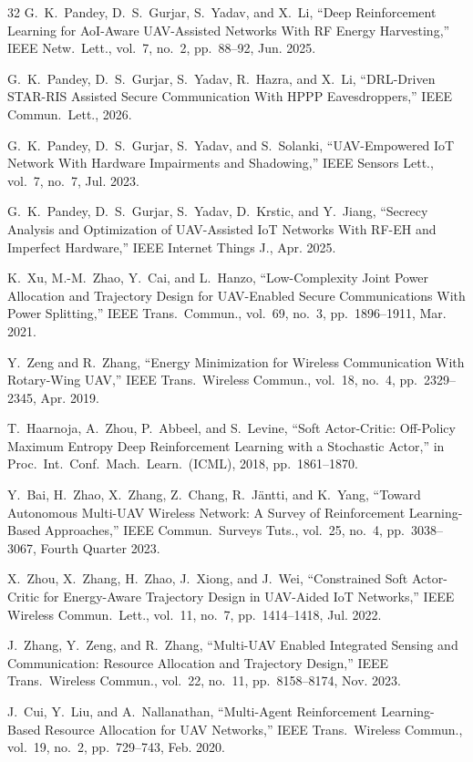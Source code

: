 \documentclass[journal]{IEEEtran}
\begin{document}
\begin{thebibliography}{32}
G.~K.~Pandey, D.~S.~Gurjar, S.~Yadav, and X.~Li,
``Deep Reinforcement Learning for AoI-Aware UAV-Assisted Networks With RF Energy Harvesting,''
IEEE Netw.\ Lett., vol.~7, no.~2, pp.~88--92, Jun. 2025.

G.~K.~Pandey, D.~S.~Gurjar, S.~Yadav, R.~Hazra, and X.~Li,
``DRL-Driven STAR-RIS Assisted Secure Communication With HPPP Eavesdroppers,''
IEEE Commun.\ Lett., 2026.

G.~K.~Pandey, D.~S.~Gurjar, S.~Yadav, and S.~Solanki,
``UAV-Empowered IoT Network With Hardware Impairments and Shadowing,''
IEEE Sensors Lett., vol.~7, no.~7, Jul. 2023.

G.~K.~Pandey, D.~S.~Gurjar, S.~Yadav, D.~Krstic, and Y.~Jiang,
``Secrecy Analysis and Optimization of UAV-Assisted IoT Networks With RF-EH and Imperfect Hardware,''
IEEE Internet Things J., Apr. 2025.

K.~Xu, M.-M.~Zhao, Y.~Cai, and L.~Hanzo,
``Low-Complexity Joint Power Allocation and Trajectory Design for UAV-Enabled Secure Communications With Power Splitting,''
IEEE Trans.\ Commun., vol.~69, no.~3, pp.~1896--1911, Mar. 2021.

Y.~Zeng and R.~Zhang,
``Energy Minimization for Wireless Communication With Rotary-Wing UAV,''
IEEE Trans.\ Wireless Commun., vol.~18, no.~4, pp.~2329--2345, Apr. 2019.

T.~Haarnoja, A.~Zhou, P.~Abbeel, and S.~Levine,
``Soft Actor-Critic: Off-Policy Maximum Entropy Deep Reinforcement Learning with a Stochastic Actor,''
in Proc.\ Int.\ Conf.\ Mach.\ Learn.\ (ICML), 2018, pp.~1861--1870.

Y.~Bai, H.~Zhao, X.~Zhang, Z.~Chang, R.~J\"{a}ntti, and K.~Yang,
``Toward Autonomous Multi-UAV Wireless Network: A Survey of Reinforcement Learning-Based Approaches,''
IEEE Commun.\ Surveys Tuts., vol.~25, no.~4, pp.~3038--3067, Fourth Quarter 2023.

X.~Zhou, X.~Zhang, H.~Zhao, J.~Xiong, and J.~Wei,
``Constrained Soft Actor-Critic for Energy-Aware Trajectory Design in UAV-Aided IoT Networks,''
IEEE Wireless Commun.\ Lett., vol.~11, no.~7, pp.~1414--1418, Jul. 2022.

J.~Zhang, Y.~Zeng, and R.~Zhang,
``Multi-UAV Enabled Integrated Sensing and Communication: Resource Allocation and Trajectory Design,''
IEEE Trans.\ Wireless Commun., vol.~22, no.~11, pp.~8158--8174, Nov. 2023.

J.~Cui, Y.~Liu, and A.~Nallanathan,
``Multi-Agent Reinforcement Learning-Based Resource Allocation for UAV Networks,''
IEEE Trans.\ Wireless Commun., vol.~19, no.~2, pp.~729--743, Feb. 2020.

\end{thebibliography}

\balance
\end{document}
